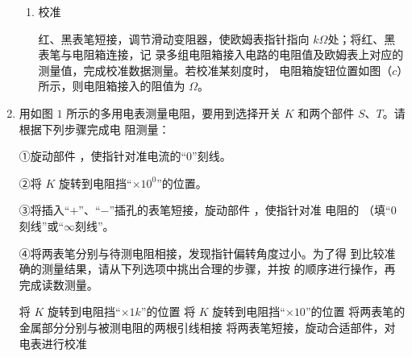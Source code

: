 \begin{enumerate}
\begin{enumerate}
\item 
校准

红、黑表笔短接，调节滑动变阻器，使欧姆表指针指向 \underlinegap $ k \Omega $处；将红、黑表笔与电阻箱连接，记
录多组电阻箱接入电路的电阻值及欧姆表上对应的测量值，完成校准数据测量。若校准某刻度时，
电阻箱旋钮位置如图（$ c $）所示，则电阻箱接入的阻值为 \underlinegap $ \Omega $。




\end{enumerate}



\item 
{}
用如图 $ 1 $ 所示的多用电表测量电阻，要用到选择开关 $ K $ 和两个部件 $ S $、$ T $。请根据下列步骤完成电
阻测量：

①旋动部件 \underlinegap ，使指针对准电流的“$ 0 $”刻线。

②将 $ K $ 旋转到电阻挡“$ \times 10^{0} $”的位置。



③将插入“$ + $”、“$ - $”插孔的表笔短接，旋动部件 \underlinegap ，使指针对准
电阻的 \underlinegap （填“$ 0 $ 刻线”或“$ \infty $刻线”。


④将两表笔分别与待测电阻相接，发现指针偏转角度过小。为了得
到比较准确的测量结果，请从下列选项中挑出合理的步骤，并按 \underlinegap 
的顺序进行操作，再完成读数测量。
\begin{figure}[h!]
\centering

\end{figure}


\fourchoices
{将 $ K $ 旋转到电阻挡“$ \times 1k $”的位置}
{将 $ K $ 旋转到电阻挡“$ \times 10 $”的位置}
{将两表笔的金属部分分别与被测电阻的两根引线相接}
{将两表笔短接，旋动合适部件，对电表进行校准}








\end{enumerate}
